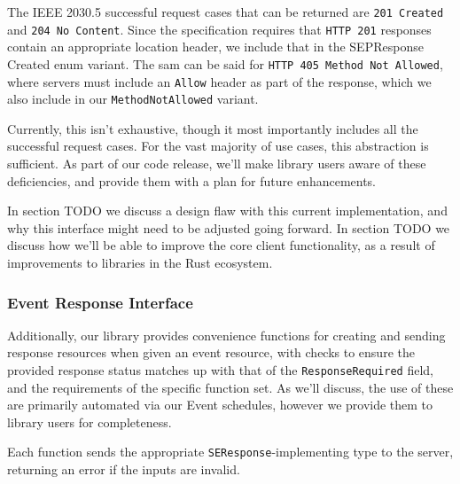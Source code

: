 The IEEE 2030.5 successful request cases that can be returned are \texttt{201 Created} and \texttt{204 No Content}. Since the specification requires that \texttt{HTTP 201} responses contain an appropriate location header, we include that in the SEPResponse Created enum variant. The sam can be said for \texttt{HTTP 405 Method Not Allowed}, where servers must include an \texttt{Allow} header as part of the response, which we also include in our \texttt{MethodNotAllowed} variant.

Currently, this isn't exhaustive, though it most importantly includes all the successful request cases. For the vast majority of use cases, this abstraction is sufficient. As part of our code release, we'll make library users aware of these deficiencies, and provide them with a plan for future enhancements.

In section TODO we discuss a design flaw with this current implementation, and why this interface might need to be adjusted going forward. In section TODO we discuss how we'll be able to improve the core client functionality, as a result of improvements to libraries in the Rust ecosystem.

\subsubsection{Event Response Interface}

Additionally, our library provides convenience functions for creating and sending response resources when given an event resource, with checks to ensure the provided response status matches up with that of the \texttt{ResponseRequired} field, and the requirements of the specific function set.  As we'll discuss, the use of these are primarily automated via our Event schedules, however we provide them to library users for completeness.

Each function sends the appropriate \texttt{SEResponse}-implementing type to the server, returning an error if the inputs are invalid.


